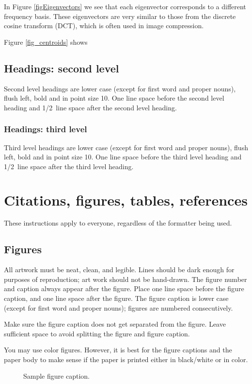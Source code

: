 \documentclass{article} %
\begin{document}
In Figure \ref{figEigenvectors} we see that each eigenvector corresponds to a different frequency basis. These eigenvectors are very similar to those from the discrete cosine transform (DCT), which is often used in image compression.

Figure \ref{fig_centroids} shows

\subsection{Headings: second level}

Second level headings are lower case (except for first word and proper nouns),
flush left, bold and in point size 10. One line space before the second level
heading and 1/2~line space after the second level heading.

\subsubsection{Headings: third level}

Third level headings are lower case (except for first word and proper nouns),
flush left, bold and in point size 10. One line space before the third level
heading and 1/2~line space after the third level heading.

\section{Citations, figures, tables, references}
\label{others}

These instructions apply to everyone, regardless of the formatter being used.

\subsection{Figures}

All artwork must be neat, clean, and legible. Lines should be dark
enough for purposes of reproduction; art work should not be
hand-drawn. The figure number and caption always appear after the
figure. Place one line space before the figure caption, and one line
space after the figure. The figure caption is lower case (except for
first word and proper nouns); figures are numbered consecutively.

Make sure the figure caption does not get separated from the figure.
Leave sufficient space to avoid splitting the figure and figure caption.

You may use color figures.
However, it is best for the
figure captions and the paper body to make sense if the paper is printed
either in black/white or in color.
\begin{figure}[h]
\begin{center}
\fbox{\rule[-.5cm]{0cm}{4cm} \rule[-.5cm]{4cm}{0cm}}
\end{center}
\caption{Sample figure caption.}
\end{figure}
\end{document}

